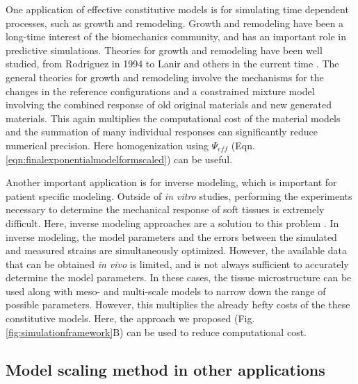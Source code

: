     One application of effective constitutive models is for simulating time dependent processes, such as growth and remodeling. Growth and remodeling have been a long-time interest of the biomechanics community, and has an important role in predictive simulations. Theories for growth and remodeling have been well studied, from Rodriguez in 1994 to Lanir and others in the current time \cite{lanir_mechanistic_2014, gleason_mixture_2004, rodriguez_stress_1994, humphrey_constrained_2002, cowin_tissue_2004, taber_biomechanics_1995}. The general theories for growth and remodeling involve the mechanisms for the changes in the reference configurations and a constrained mixture model involving the combined response of old original materials and new generated materials. This again multiplies the computational cost of the material models and the summation of many individual responses can significantly reduce numerical precision. Here homogenization using $\Psi_{eff}$ (Eqn. \ref{eqn:finalexponentialmodelformscaled}) can be useful. 
    

    Another important application is for inverse modeling, which is important for patient specific modeling. Outside of \textit{in vitro} studies, performing the experiments necessary to determine the mechanical response of soft tissues is extremely difficult. Here, inverse modeling approaches are a solution to this problem \cite{lee_inverse_2014, aggarwal_inverse_2015, aggarwal_patient_2013, kim_inverse_2009, liu_inverse_2013}. In inverse modeling, the model parameters and the errors between the simulated and measured strains are simultaneously optimized. However, the available data that can be obtained \textit{in vivo} is limited, and is not always sufficient to accurately determine the model parameters. In these cases, the tissue microstructure can be used along with meso- and multi-scale models to narrow down the range of possible parameters. However, this multiplies the already hefty costs of the these constitutive models. Here, the approach we proposed (Fig. \ref{fig:simulationframework}B) can be used to reduce computational cost.

 



\subsection{Model scaling method in other applications}
    
